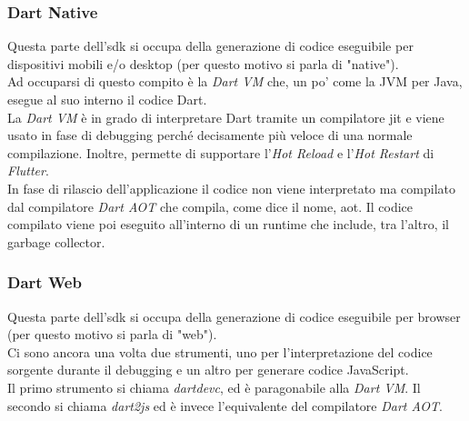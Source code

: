 \subsubsection{Dart Native}
\label{subsubsec:dart-native}

Questa parte dell'\gls{sdk} si occupa della generazione di codice eseguibile per dispositivi mobili e/o desktop (per questo motivo si parla di "native").\\
Ad occuparsi di questo compito è la \emph{Dart VM} che, un po' come la JVM per Java, esegue al suo interno il codice Dart.\\
La \emph{Dart VM} è in grado di interpretare Dart tramite un compilatore \gls{jit} e viene usato in fase di debugging perché decisamente più veloce di una normale compilazione.
Inoltre, permette di supportare l'\emph{Hot Reload} e l'\emph{Hot Restart} di \emph{Flutter}.\\
In fase di rilascio dell'applicazione il codice non viene interpretato ma compilato dal compilatore \emph{Dart AOT} che compila, come dice il nome, \gls{aot}.
Il codice compilato viene poi eseguito all'interno di un runtime che include, tra l'altro, il garbage collector.

\subsubsection{Dart Web}
\label{subsubsec:dart-web}
Questa parte dell'\gls{sdk} si occupa della generazione di codice eseguibile per browser (per questo motivo si parla di "web").\\
Ci sono ancora una volta due strumenti, uno per l'interpretazione del codice sorgente durante il debugging e un altro per generare codice JavaScript.\\
Il primo strumento si chiama \emph{dartdevc}, ed è paragonabile alla \emph{Dart VM}. Il secondo si chiama \emph{dart2js} ed è invece l'equivalente del compilatore \emph{Dart AOT}.